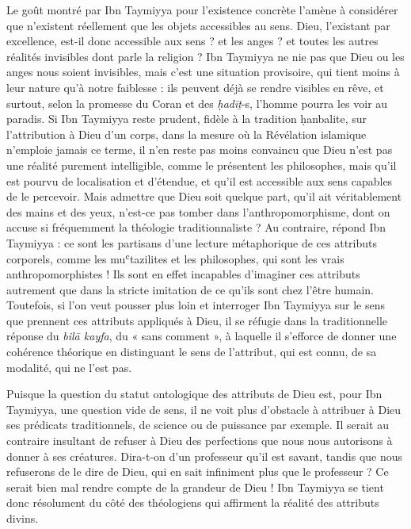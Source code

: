 Le goût montré par Ibn Taymiyya pour l'existence concrète l'amène à
considérer que n'existent réellement que les objets accessibles au sens.
Dieu, l'existant par excellence, est-il donc accessible aux sens ? et
les anges ? et toutes les autres réalités invisibles dont parle la
religion ? Ibn Taymiyya ne nie pas que Dieu ou les anges nous soient
invisibles, mais c'est une situation provisoire, qui tient moins à leur
nature qu'à notre faiblesse : ils peuvent déjà se rendre visibles en
rêve, et surtout, selon la promesse du Coran et des \emph{ḥadīṯ}-s,
l'homme pourra les voir au paradis. Si Ibn Taymiyya reste prudent,
fidèle à la tradition ḥanbalite, sur l'attribution à Dieu d'un corps,
dans la mesure où la Révélation islamique n'emploie jamais ce terme, il
n'en reste pas moins convaincu que Dieu n'est pas une réalité purement
intelligible, comme le présentent les philosophes, mais qu'il est pourvu
de localisation et d'étendue, et qu'il est accessible aux sens capables
de le percevoir. Mais admettre que Dieu soit quelque part, qu'il ait
véritablement des mains et des yeux, n'est-ce pas tomber dans
l'anthropomorphisme, dont on accuse si fréquemment la théologie
traditionnaliste ? Au contraire, répond Ibn Taymiyya : ce sont les
partisans d'une lecture métaphorique de ces attributs corporels, comme
les muʿtazilites et les philosophes, qui sont les vrais
anthropomorphistes ! Ils sont en effet incapables d'imaginer ces
attributs autrement que dans la stricte imitation de ce qu'ils sont chez
l'être humain. Toutefois, si l'on veut pousser plus loin et interroger
Ibn Taymiyya sur le sens que prennent ces attributs appliqués à Dieu, il
se réfugie dans la traditionnelle réponse du \emph{bilā kayfa}, du «
sans comment », à laquelle il s'efforce de donner une cohérence
théorique en distinguant le sens de l'attribut, qui est connu, de sa
modalité, qui ne l'est pas.

Puisque la question du statut ontologique des attributs de Dieu est,
pour Ibn Taymiyya, une question vide de sens, il ne voit plus d'obstacle
à attribuer à Dieu ses prédicats traditionnels, de science ou de
puissance par exemple. Il serait au contraire insultant de refuser à
Dieu des perfections que nous nous autorisons à donner à ses créatures.
Dira-t-on d'un professeur qu'il est savant, tandis que nous refuserons
de le dire de Dieu, qui en sait
infiniment plus que le professeur ? Ce serait bien mal rendre compte de
la grandeur de Dieu ! Ibn Taymiyya se tient donc résolument du côté des
théologiens qui affirment la réalité des attributs divins.

